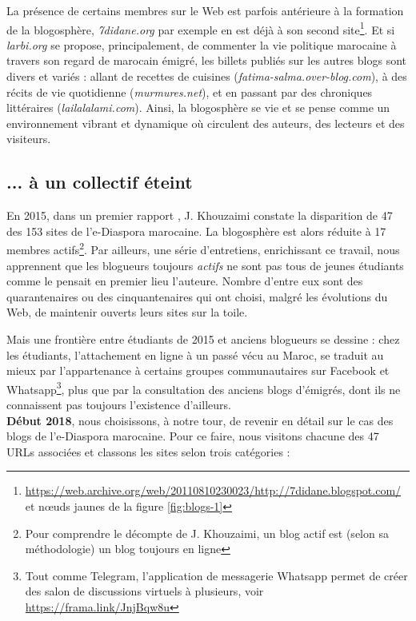 \documentclass[symmetric,justified,marginals=raggedouter]{tufte-book}
\begin{document}
La présence de certains membres sur le Web est parfois antérieure à la formation de la blogosphère, \textit{7didane.org} par exemple en est déjà à son second site\footnote{\url{https://web.archive.org/web/20110810230023/http://7didane.blogspot.com/
} et nœuds jaunes de la figure \ref{fig:blogs-1}}. Et si \textit{larbi.org} se propose, principalement, de commenter la vie politique marocaine à travers son regard de marocain émigré, les billets publiés sur les autres blogs sont divers et variés : allant de recettes de cuisines (\textit{fatima-salma.over-blog.com}), à des récits de vie quotidienne (\textit{murmures.net}), et en passant par des chroniques littéraires (\textit{lailalalami.com}).  Ainsi, la blogosphère se vie et se pense comme un environnement vibrant et dynamique où circulent des auteurs, des lecteurs et des visiteurs.

\subsection{... à un collectif éteint}

\noindent En 2015, dans un premier rapport \citep{khouzaimi_e-diasporas_2015}, J. Khouzaimi constate la disparition de 47 des 153 sites de l'e-Diaspora marocaine. La blogosphère est alors réduite à 17 membres actifs\footnote{Pour comprendre le décompte de J. Khouzaimi, un blog actif est (selon sa méthodologie) un blog toujours en ligne}. Par ailleurs, une série d'entretiens, enrichissant ce travail, nous apprennent que les blogueurs toujours \textit{actifs} ne sont pas tous de jeunes étudiants comme le pensait en premier lieu l'auteure. Nombre d'entre eux sont des quarantenaires ou des cinquantenaires qui ont choisi, malgré les évolutions du Web, de maintenir ouverts leurs sites sur la toile. 

Mais une frontière entre étudiants de 2015 et anciens blogueurs se dessine : chez les étudiants, l'attachement en ligne à un passé vécu au Maroc, se traduit au mieux par l'appartenance à certains groupes communautaires sur Facebook et Whatsapp\footnote{Tout comme Telegram, l'application de messagerie Whatsapp permet de créer des salon de discussions virtuels à plusieurs, voir \url{https://frama.link/JnjBqw8u}}, plus que par la consultation des anciens blogs d'émigrés, dont ils ne connaissent pas toujours l'existence d'ailleurs. \\

\noindent \textbf{Début 2018}, nous choisissons, à notre tour, de revenir en détail sur le cas des blogs de l'e-Diaspora marocaine. Pour ce faire, nous visitons chacune des 47 URLs associées et classons les sites selon trois catégories :
\end{document}
